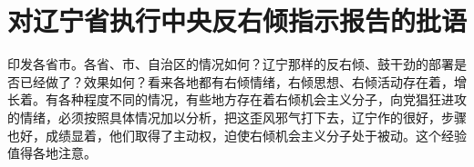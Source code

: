 \section[对辽宁省执行中央反右倾指示报告的批语（一九五九年八月十二日）]{对辽宁省执行中央反右倾指示报告的批语}


印发各省市。各省、市、自治区的情况如何？辽宁那样的反右倾、鼓干劲的部署是否已经做了？效果如何？看来各地都有右倾情绪，右倾思想、右倾活动存在着，增长着。有各种程度不同的情况，有些地方存在着右倾机会主义分子，向党猖狂进攻的情绪，必须按照具体情况加以分析，把这歪风邪气打下去，辽宁作的很好，步骤也好，成绩显着，他们取得了主动权，迫使右倾机会主义分子处于被动。这个经验值得各地注意。


